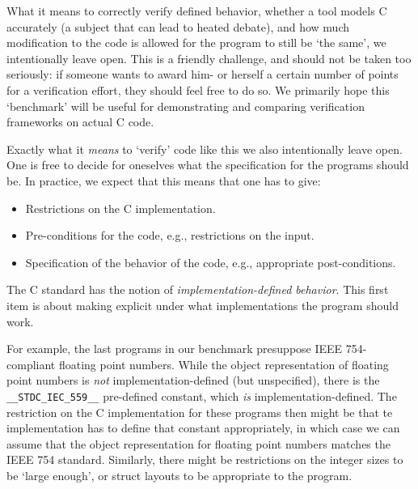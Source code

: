 \documentclass{article}
\begin{document}
What it means to correctly verify defined behavior, whether a tool
models C accurately (a subject that can lead to heated debate), and how much modification to the code is allowed
for the program to still be `the same', we intentionally leave open.
This is a friendly challenge, and should not be taken too seriously:
if someone wants to award him- or herself a certain number of points
for a verification effort, they should feel free to do so.
We primarily hope this `benchmark' will be useful for demonstrating and comparing verification frameworks on actual C code.

Exactly what it \emph{means} to `verify' code like this we also intentionally
leave open.
One is free to decide for oneselves what the specification for the programs should be.
In practice, we expect that this means that one has to give:
\begin{itemize}
\item
Restrictions on the C implementation.
\item
Pre-conditions for the code, e.g., restrictions on the input.
\item
Specification of the behavior of the code, e.g., appropriate post-conditions.
\end{itemize}
The C standard \cite{iso:11} has the notion of \emph{implementation-defined
behavior}.
This first item is about making
explicit under what implementations the program should work.

For example, the last programs in our benchmark presuppose IEEE 754-compliant
floating point numbers.
While the object representation of floating point numbers is \emph{not} im\-ple\-men\-ta\-tion-defined (but unspecified),
there is the \lstinline|__STDC_IEC_559__| pre-defined constant, which \emph{is} implementation-defined.
The restriction on the C implementation for these programs then might be that
te implementation has to define that constant appropriately,
in which case we can assume that the object representation for floating point numbers matches the IEEE 754 standard.
Similarly, there might be restrictions on the integer sizes to be `large enough', or struct layouts to be appropriate to the program.
\end{document}
